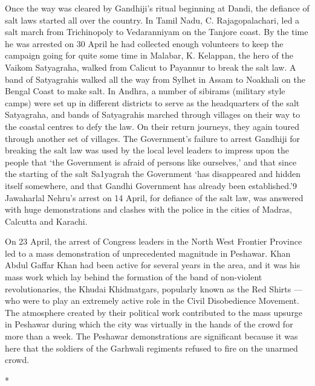 Once the way was cleared by Gandhiji's ritual beginning at Dandi, the defiance of salt laws started all over the country. In Tamil Nadu, C. Rajagopalachari, led a salt march from Trichinopoly to Vedaranniyam on the Tanjore coast. By the time he was arrested on 30 April he had collected enough volunteers to keep the campaign going for quite some time in Malabar, K. Kelappan, the hero of the Vaikom Satyagraha, walked from Calicut to Payannur to break the salt law. A band of Satyagrahis walked all the way from Sylhet in Assam to Noakhali on the Bengal Coast to make salt. In Andhra, a number of sibirams (military style camps) were set up in different districts to serve as the headquarters of the salt Satyagraha, and bands of Satyagrahis marched through villages on their way to the coastal centres to defy the law. On their return journeys, they again toured through another set of villages. The Government's failure to arrest Gandhiji for breaking the salt law was used by the local level leaders to impress upon the people that `the Government is afraid of persons like ourselves,' and that since the starting of the salt Sa1yagrah the Government `has disappeared and hidden itself somewhere, and that Gandhi Government has already been established.'9 Jawaharlal Nehru's arrest on 14 April, for defiance of the salt law, was answered with huge demonstrations and clashes with the police in the cities of Madras, Calcutta and Karachi. 

On 23 April, the arrest of Congress leaders in the North West Frontier Province led to a mass demonstration of unprecedented magnitude in Peshawar. Khan Abdul Gaffar Khan had been active for several years in the area, and it was his mass work which lay behind the formation of the band of non-violent revolutionaries, the Khudai Khidmatgars, popularly known as the Red Shirts — who were to play an extremely active role in the Civil Disobedience Movement. The atmosphere created by their political work contributed to the mass upsurge in Peshawar during which the city was virtually in the hands of the crowd for more than a week. The Peshawar demonstrations are significant because it was here that the soldiers of the Garhwali regiments refused to fire on the unarmed crowd.

\begin{center}*\end{center}


